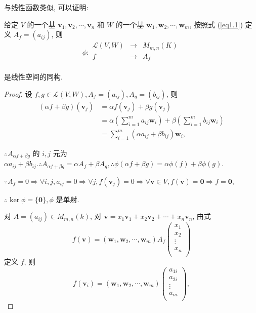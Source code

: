 \documentclass{ctexart}
\begin{document}
与线性函数类似, 可以证明:
\begin{theorem}[书上的定理 2(i)]\label{t1.2}
    给定 $V$ 的一个基 $\boldsymbol{v}_1,\boldsymbol{v}_2,\cdots,\boldsymbol{v}_n$ 和 $W$ 的一个基 $\boldsymbol{w}_1,\boldsymbol{w}_2,\cdots,\boldsymbol{w}_m$, 按照式 (\ref{eq1.1}) 定义 $A_f=(a_{ij})$, 则
    \[\phi:\begin{array}{rcl}
        \mathcal{L}(V,W) & \to & M_{m,n}(K) \\
        f & \to & A_f \\
    \end{array}\]

    是线性空间的同构.
\end{theorem}
\begin{proof}
    设 $f,g\in\mathcal{L}(V,W),A_f=(a_{ij}),A_g=(b_{ij})$, 则
    \begin{align*}
        (\alpha f+\beta g)(\boldsymbol{v}_j) & =\alpha f(\boldsymbol{v}_j)+\beta g(\boldsymbol{v}_j) \\
        & =\alpha\left(\sum\limits_{i=1}^ma_{ij}\boldsymbol{w}_i\right)+\beta\left(\sum\limits_{i=1}^mb_{ij}\boldsymbol{w}_i\right) \\
        & =\sum\limits_{i=1}^m(\alpha a_{ij}+\beta b_{ij})\boldsymbol{w}_i,
    \end{align*}
    
    $\therefore A_{\alpha f+\beta g}$ 的 $i,j$ 元为 $\alpha a_{ij}+\beta b_{ij}.\therefore A_{\alpha f+\beta g}=\alpha A_f+\beta A_g,\therefore\phi(\alpha f+\beta g)=\alpha\phi(f)+\beta\phi(g)$.

    $\because A_f=0\Rightarrow\forall i,j,a_{ij}=0\Rightarrow\forall j,f(\boldsymbol{v}_j)=0\Rightarrow\forall\boldsymbol{v}\in V,f(\boldsymbol{v})=\boldsymbol{0}\Rightarrow f=\boldsymbol{0}$,

    $\therefore\ker\phi=\{\boldsymbol{0}\},\phi$ 是单射.

    对 $A=(a_{ij})\in M_{m,n}(k)$, 对 $\boldsymbol{v}=x_1\boldsymbol{v}_1+x_2\boldsymbol{v}_2+\cdots+x_n\boldsymbol{v}_n$, 由式
    \[f(\boldsymbol{v})=(\boldsymbol{w}_1,\boldsymbol{w}_2,\cdots,\boldsymbol{w}_m)A_f\begin{pmatrix}
        x_1 \\
        x_2 \\
        \vdots \\
        x_n \\
    \end{pmatrix}\]
    定义 $f$, 则
    \[f(\boldsymbol{v}_i)=(\boldsymbol{w}_1,\boldsymbol{w}_2,\cdots,\boldsymbol{w}_m)\begin{pmatrix}
        a_{1i} \\
        a_{2i} \\
        \vdots \\
        a_{ni} \\
    \end{pmatrix},\]


\end{proof}
\end{document}
